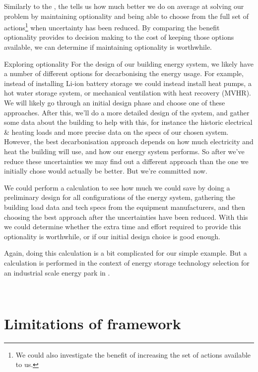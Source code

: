 Similarly to the , the  tells us how much better we do on average at solving our problem by maintaining optionality and being able to choose from the full set of actions\footnote{We could also investigate the benefit of increasing the set of actions available to us.} when uncertainty has been reduced. By comparing the benefit optionality provides to decision making to the cost of keeping those options available, we can determine if maintaining optionality is worthwhile.\\

\begin{ebox}{Exploring optionality}
    For the design of our building energy system, we likely have a number of different options for decarbonising the energy usage. For example, instead of installing Li-ion battery storage we could instead install heat pumps, a hot water storage system, or mechanical ventilation with heat recovery (MVHR). We will likely go through an initial design phase and choose one of these approaches. After this, we'll do a more detailed design of the system, and gather some data about the building to help with this, for instance the historic electrical \& heating loads and more precise data on the specs of our chosen system. However, the best decarbonisation approach depends on how much electricity and heat the building will use, and how our energy system performs. So after we've reduce these uncertainties we may find out a different approach than the one we initially chose would actually be better. But we're committed now.

    We could perform a  calculation to see how much we could save by doing a preliminary design for all configurations of the energy system, gathering the building load data and tech specs from the equipment manufacturers, and then choosing the best approach after the uncertainties have been reduced. With this we could determine whether the extra time and effort required to provide this optionality is worthwhile, or if our initial design choice is good enough.

    Again, doing this calculation is a bit complicated for our simple example. But a  calculation is performed in the context of energy storage technology selection for an industrial scale energy park in .
\end{ebox}\


\section{Limitations of framework} \label{sec:methodology-limitations}

